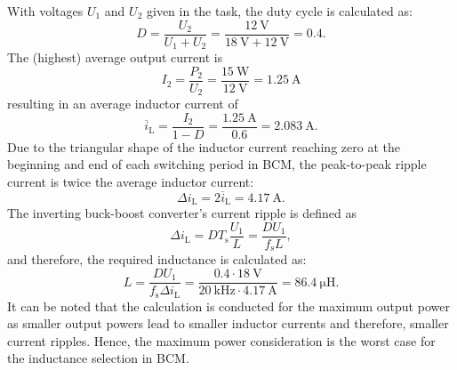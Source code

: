 \begin{solutionblock}
	With voltages $U_1$ and $U_2$ given in the task, the duty cycle is calculated as:
	\begin{equation}
		D = \frac{U_\mathrm{2}}{U_\mathrm{1}+U_\mathrm{2}} = \frac{\SI{12}{\volt}}{\SI{18}{\volt}+\SI{12}{\volt}} = 0.4.
	\end{equation}
	The (highest) average output current is
	\begin{equation}
		I_\mathrm{2} = \frac{P_\mathrm{2}}{U_\mathrm{2}} = \frac{\SI{15}{\watt}}{\SI{12}{\volt}} = \SI{1.25}{\ampere}
	\end{equation}
	resulting in an average inductor current of
	\begin{equation}
		\overline{i}_\mathrm{L} = \frac{I_\mathrm{2}}{1-D} = \frac{\SI{1.25}{\ampere}}{0.6} = \SI{2.083}{\ampere}.
	\end{equation}
	Due to the triangular shape of the inductor current reaching zero at the beginning and end of each switching period in BCM, the peak-to-peak ripple current is twice the average inductor current:
	\begin{equation}
		\Delta i_{\mathrm{L}} = 2 \overline{i}_\mathrm{L} = \SI{4.17}{\ampere}.
	\end{equation}
	The inverting buck-boost converter's current ripple is defined as
	\begin{equation}
		\Delta i_{\mathrm{L}} = D T_\mathrm{s} \frac{U_1}{L} = \frac{D U_1}{f_\mathrm{s} L},
		\label{eq:sol_task_3_1_buck_boost_current_ripple}
	\end{equation}
	and therefore, the required inductance is calculated as:
	\begin{equation}
		L = \frac{D U_1}{f_\mathrm{s} \Delta i_{\mathrm{L}}} = \frac{0.4 \cdot \SI{18}{\volt}}{\SI{20}{\kilo\hertz} \cdot \SI{4.17}{\ampere}} = \SI{86.4}{\micro\henry}.
	\end{equation}
	It can be noted that the calculation is conducted for the maximum output power as smaller output powers lead to smaller inductor currents and therefore, smaller current ripples. Hence, the maximum power consideration is the worst case for the inductance selection in BCM.
\end{solutionblock}

